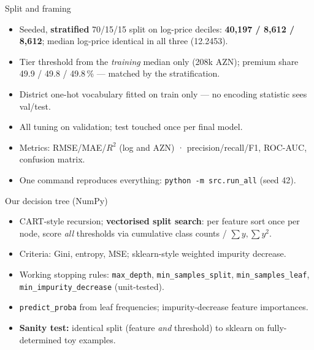 \documentclass[aspectratio=169,10pt]{beamer}
\begin{document}
\begin{frame}{Split and framing}
  \begin{itemize}
    \item Seeded, \textbf{stratified} 70/15/15 split on log-price deciles:
          \textbf{40{,}197 / 8{,}612 / 8{,}612}; median log-price
          identical in all three (12.2453).
    \item Tier threshold from the \emph{training} median only (208k AZN);
          premium share 49.9 / 49.8 / 49.8\,\% --- matched by the
          stratification.
    \item District one-hot vocabulary fitted on train only --- no
          encoding statistic sees val/test.
    \item All tuning on validation; test touched once per final model.
    \item Metrics: RMSE/MAE/$R^2$ (log and AZN) · precision/recall/F1,
          ROC-AUC, confusion matrix.
    \item One command reproduces everything:
          \texttt{python -m src.run\_all} (seed 42).
  \end{itemize}
\end{frame}

\begin{frame}{Our decision tree (NumPy)}
  \begin{itemize}
    \item CART-style recursion; \textbf{vectorised split search}: per
          feature sort once per node, score \emph{all} thresholds via
          cumulative class counts / $\sum y, \sum y^2$.
    \item Criteria: Gini, entropy, MSE; sklearn-style weighted impurity
          decrease.
    \item Working stopping rules: \texttt{max\_depth},
          \texttt{min\_samples\_split}, \texttt{min\_samples\_leaf},
          \texttt{min\_impurity\_decrease} (unit-tested).
    \item \texttt{predict\_proba} from leaf frequencies;
          impurity-decrease feature importances.
    \item \textbf{Sanity test:} identical split (feature \emph{and}
          threshold) to sklearn on fully-determined toy examples.
  \end{itemize}
\end{frame}
\end{document}
